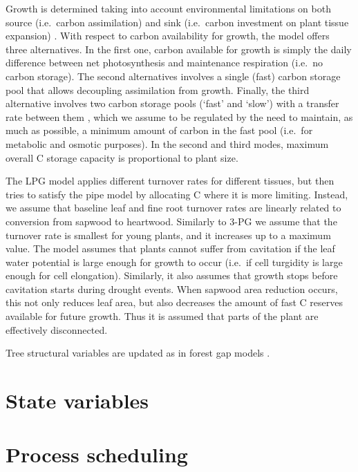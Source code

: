 \documentclass[]{book}
\begin{document}
Growth is determined taking into account environmental limitations on both source (i.e.~carbon assimilation) and sink (i.e.~carbon investment on plant tissue expansion) \citep{Fatichi2014, Guillemot2015, Korner2015}. With respect to carbon availability for growth, the model offers three alternatives. In the first one, carbon available for growth is simply the daily difference between net photosynthesis and maintenance respiration (i.e.~no carbon storage). The second alternatives involves a single (fast) carbon storage pool that allows decoupling assimilation from growth. Finally, the third alternative involves two carbon storage pools (`fast' and `slow') with a transfer rate between them \citep{Richardson2013, Dietze2014}, which we assume to be regulated by the need to maintain, as much as possible, a minimum amount of carbon in the fast pool (i.e.~for metabolic and osmotic purposes). In the second and third modes, maximum overall C storage capacity is proportional to plant size.

The LPG model \citep{Sitch2003} applies different turnover rates for different tissues, but then tries to satisfy the pipe model \citep{Shinozaki1964} by allocating C where it is more limiting. Instead, we assume that baseline leaf and fine root turnover rates are linearly related to conversion from sapwood to heartwood. Similarly to 3-PG \citep{Landsberg1997} we assume that the turnover rate is smallest for young plants, and it increases up to a maximum value. The model assumes that plants cannot suffer from cavitation if the leaf water potential is large enough for growth to occur (i.e.~if cell turgidity is large enough for cell elongation). Similarly, it also assumes that growth stops before cavitation starts during drought events. When sapwood area reduction occurs, this not only reduces leaf area, but also decreases the amount of fast C reserves available for future growth. Thus it is assumed that parts of the plant are effectively disconnected.

Tree structural variables are updated as in forest gap models \citep{Lindner1997}.

\hypertarget{state-variables-2}{%
\section{State variables}\label{state-variables-2}}

\hypertarget{process-scheduling-2}{%
\section{Process scheduling}\label{process-scheduling-2}}
\end{document}
